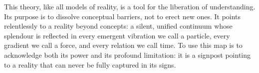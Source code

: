 	\begin{philosophical}
		This theory, like all models of reality, is a tool for the liberation of understanding. Its purpose is to dissolve conceptual barriers, not to erect new ones. It points relentlessly to a reality beyond concepts: a silent, unified continuum whose splendour is reflected in every emergent vibration we call a particle, every gradient we call a force, and every relation we call time. To use this map is to acknowledge both its power and its profound limitation: it is a signpost pointing to a reality that can never be fully captured in its signs.
	\end{philosophical}
